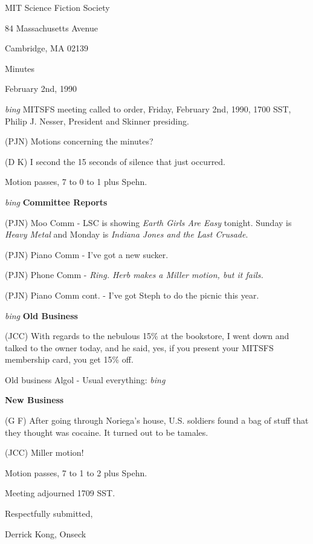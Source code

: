 \setlength{\topmargin}{-0.5in}
\setlength{\oddsidemargin}{0.0in}
\setlength{\evensidemargin}{0.0in}
\setlength{\textheight}{9in}
\setlength{\textwidth}{6.5in}



\begin{center}
MIT Science Fiction Society

84 Massachusetts Avenue

Cambridge, MA 02139

\vspace{0.2in}
Minutes

February 2nd, 1990

\end{center}
 
\vspace{0.15in}
{\em bing\/}  MITSFS meeting called to order, Friday, February 2nd, 1990,
1700 SST, Philip J. Nesser, President and Skinner presiding.

(PJN) Motions concerning the minutes?

(D K) I second the 15 seconds of silence that just occurred.

Motion passes, 7 to 0 to 1 plus Spehn.

\vspace{0.15in}
{\em bing\/} {\bf Committee Reports}

(PJN) Moo Comm - LSC is showing {\em Earth Girls Are Easy} tonight.
Sunday is {\em Heavy Metal} and Monday is {\em Indiana Jones and the
Last Crusade}.

(PJN) Piano Comm - I've got a new sucker.

(PJN) Phone Comm - {\em Ring.  Herb makes a Miller motion, but it
fails.}

(PJN) Piano Comm cont. - I've got Steph to do the picnic this year.

\vspace{0.15in}
{\em bing\/} {\bf Old Business}

(JCC) With regards to the nebulous 15\% at the bookstore, I went down
and talked to the owner today, and he said, yes, if you present your
MITSFS membership card, you get 15\% off.

Old business Algol - Usual everything: {\em bing\/}

\vspace{0.15in}
{\bf New Business}

(G F) After going through Noriega's house, U.S. soldiers found a bag
of stuff that they thought was cocaine.  It turned out to be tamales.

(JCC) Miller motion!

Motion passes, 7 to 1 to 2 plus Spehn.

Meeting adjourned 1709 SST.

\vspace{0.15in}
\begin{center}
Respectfully submitted,

Derrick Kong, Onseck
\end{center}

